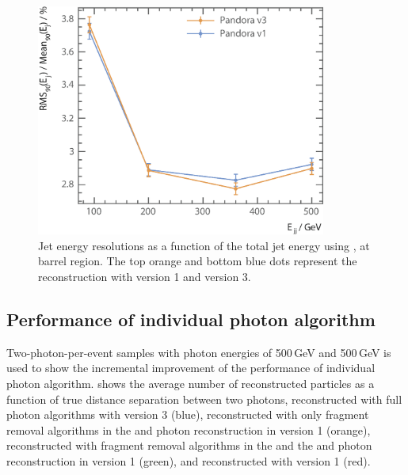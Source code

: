 



\begin{figure}[tbph]
\centering
\includegraphics[width=0.85\textwidth]{photon/JERnew2}
\caption[Jet energy resolution as a function of the di-jet energy]
{Jet energy resolutions as a function of the total jet energy using \eeZuds, at barrel region. The top orange and bottom blue dots represent the  reconstruction with \pandora version 1 and version 3.}
\label{fig:photonJER}
\end{figure}


\subsection{Performance of individual photon algorithm}





Two-photon-per-event samples with photon energies of  500\,GeV and 500\,GeV is used to show the incremental improvement of the performance of individual photon algorithm.  shows the average number of reconstructed particles as a function of true distance separation between two photons, reconstructed with full photon algorithms with \pandora version 3 (blue), reconstructed with only fragment removal algorithms in the \ECAL and photon reconstruction in  \pandora version 1 (orange), reconstructed with fragment removal algorithms in the \ECAL and the \HCAL and photon reconstruction in  \pandora version 1 (green), and reconstructed with \pandora version 1 (red).

